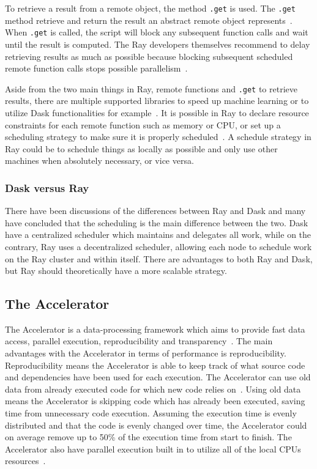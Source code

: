 \documentclass[12pt, a4paper]{article}
\begin{document}
To retrieve a result from a remote object, the method \texttt{.get} is used.
The \texttt{.get} method retrieve and return the result an abstract remote object represents~\cite{ray:FetchingResults}.
When \texttt{.get} is called, the script will block any subsequent function calls and wait until the result is computed.
The Ray developers themselves recommend to delay retrieving results as much as possible because blocking subsequent scheduled remote function calls stops possible parallelism~\cite{ray:delayget}.

Aside from the two main things in Ray, remote functions and \texttt{.get} to retrieve results, there are multiple supported libraries to speed up machine learning or to utilize Dask functionalities for example~\cite{ray:RaySGD, ray:Rayrllib, ray:RayTune, ray:RaySklearn, ray:DaskOnRay}. 
It is possible in Ray to declare resource constraints for each remote function such as memory or CPU, or set up a scheduling strategy to make sure it is properly scheduled~\cite{ray:Resources, ray:PlacementGroup}.
A schedule strategy in Ray could be to schedule things as locally as possible and only use other machines when absolutely necessary, or vice versa.

\subsubsection{Dask versus Ray}

There have been discussions of the differences between Ray and Dask and many have concluded that the scheduling is the main difference between the two.
Dask have a centralized scheduler which maintains and delegates all work, while on the contrary, Ray uses a decentralized scheduler, allowing each node to schedule work on the Ray cluster and within itself.
There are advantages to both Ray and Dask, but Ray should theoretically have a more scalable strategy.


\subsection{The Accelerator}

The Accelerator is a data-processing framework which aims to provide fast data access, parallel execution, reproducibility and transparency~\cite{exax:Accelerator}.
The main advantages with the Accelerator in terms of performance is reproducibility.
Reproducibility means the Accelerator is able to keep track of what source code and dependencies have been used for each execution.
The Accelerator can use old data from already executed code for which new code relies on~\cite{exax:sourceCode}.
Using old data means the Accelerator is skipping code which has already been executed, saving time from unnecessary code execution.
Assuming the execution time is evenly distributed and that the code is evenly changed over time, the Accelerator could on average remove up to 50\% of the execution time from start to finish.
The Accelerator also have parallel execution built in to utilize all of the local CPUs resources~\cite{exax:parallelExecution}.
\end{document}
